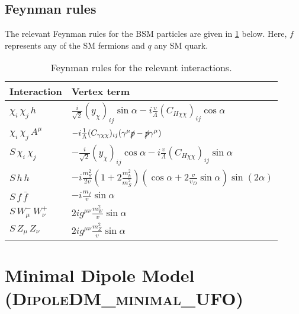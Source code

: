 \documentclass[a4paper,11pt]{article}
\begin{document}
\subsection*{Feynman rules}

The relevant Feynman rules for the BSM particles are given in \cref{tab:feynmanRules} below. Here, $f$ represents any of the SM fermions and $q$ any SM quark.

\begin{table}[h!]   \centering
    \vspace{0.2cm}
        \caption{Feynman rules for the relevant interactions. \label{tab:feynmanRules}}
    \begin{tabular}{p{2cm}|p{8.5cm}}
      \toprule
      \textbf{Interaction} & \textbf{Vertex term}\\ \toprule 
      $\chi_i\,\chi_j\,h$  & $ \frac{i}{\sqrt{2}} (y_{\chi})_{ij} \sin\alpha -i \frac{v}{\Lambda} (C_{H\chi\chi})_{ij} \cos\alpha $\\
      $\chi_i\,\chi_j\, A^\mu$  & $-i \frac{1}{\Lambda} (C_{\gamma\chi\chi})_{ij} (\gamma^\mu \slashed{p} - \slashed{p} \gamma^\mu)$\\
      $S\,\chi_i\,\chi_j$  & $ -\frac{i}{\sqrt{2}} (y_{\chi})_{ij} \cos\alpha -i \frac{v}{\Lambda} (C_{H\chi\chi})_{ij} \sin\alpha $\\      
      $S\,h\,h$  & $- i \frac{m_{S}^{2}}{2 v}  \left( 1 + 2 \frac{m_{h}^{2}}{m_{S}^{2}}\right)  \left( \cos\alpha + 2 \frac{v}{v_D} \sin\alpha \right)  \sin (2\alpha)$\\
      $S\,f\,\bar{f}$  & $-i \frac{m_f}{v} \sin\alpha$ \\      
      $S\,W_\mu^-\,W_\nu^+$  & $2 i g^{\mu\nu} \frac{m_{W}^2}{v} \sin\alpha$\\
      $S\,Z_\mu\,Z_\nu$  & $2 i g^{\mu\nu} \frac{m_{Z}^2}{v} \sin\alpha$\\
      \bottomrule        
    \end{tabular}
\end{table}

\section{Minimal Dipole Model (\textsc{\small DipoleDM\_minimal\_UFO})}
\end{document}
